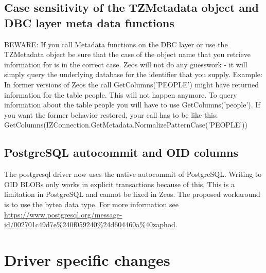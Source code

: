 \documentclass[a4paper,12pt,oneside]{article}
\begin{document}
\subsection{Case sensitivity of the TZMetadata object and DBC layer meta data functions}
\label{sec:BreakingChanges_MetadataCaseSensitivity}
BEWARE: If you call Metadata functions on the DBC layer or use the TZMetadata object be sure that the case of the object name that you retrieve information for is in the correct case.
Zeos will not do any guesswork - it will simply query the underlying database for the identifier that you supply.
Example: In former versions of Zeos the call GetColumns('PEOPLE') might have returned information for the table people.
This will not happen anymore.
To query information about the table people you will have to use GetColumns('people').
If you want the former behavior restored, your call has to be like this:\\
GetColumns(\-IZConnection.\-GetMetadata.\-NormalizePatternCase('PEOPLE'))

\subsection{PostgreSQL autocommit and OID columns}
\label{sec:BreakingChanges_PostgresqlAutocommitOids}
The postgresql driver now uses the native autocommit of PostgreSQL.
Writing to OID BLOBs only works in explicit transactions because of this. 
This is a limitation in PostgreSQL and cannot be fixed in Zeos.
The proposed workaround is to use the bytea data type.
For more information see \url{https://www.postgresql.org/message-id/002701c49d7e%240f059240%24d604460a%40zaphod}.

\section{Driver specific changes}
\label{sec:DriverSpecificChanges}
\end{document}
